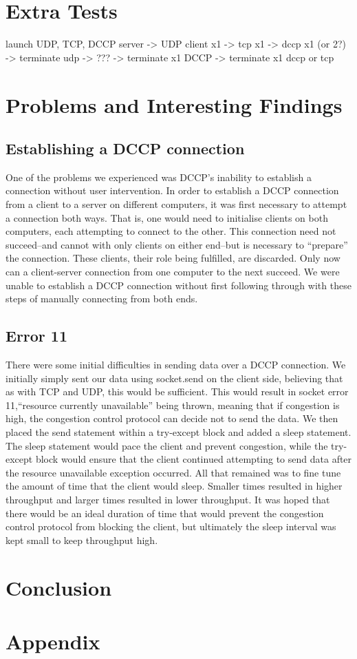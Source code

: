 \documentclass[10pt,a4paper]{article}
\begin{document}
\section{Extra Tests} %

launch UDP, TCP, DCCP server -> UDP client x1 -> tcp x1 -> dccp x1 (or 2?) ->
terminate udp -> ??? -> terminate x1 DCCP -> terminate x1 dccp or tcp

\section{Problems and Interesting Findings}

\subsection{Establishing a DCCP connection}
One of the problems we experienced was DCCP's inability to establish a connection
without user intervention. In order to establish a DCCP connection from a client to
a server on different computers, it was first necessary to attempt a connection both ways. 
That is, one would need to initialise clients on both computers, each attempting to connect
to the other. This connection need not succeed--and cannot with only clients on either end--but 
is necessary to ``prepare'' the connection. These clients, their role being fulfilled, are
discarded. Only now can a client-server connection from one computer to the next succeed. 
We were unable to establish a DCCP connection without first following through with these steps of 
manually connecting from both ends.

\subsection{Error 11}
There were some initial difficulties in sending data over a DCCP connection. We initially
simply sent our data using socket.send on the client side, believing that as with TCP
and UDP, this would be sufficient. This would result in socket error 11,``resource currently
unavailable'' being thrown, meaning that if congestion is high, the congestion control 
protocol can decide not to send the data. We then placed the send statement within a try-except
block and added a sleep statement. The sleep statement would pace the client and prevent
congestion, while the try-except block would ensure that the client
continued attempting to send data after the resource unavailable exception occurred. All that
remained was to fine tune the amount of time that the client would sleep. Smaller times resulted
in higher throughput and larger times resulted in lower throughput. It was hoped that there would be
an ideal duration of time that would prevent the congestion control protocol from blocking the client,
but ultimately the sleep interval was kept small to keep throughput high.

\section{Conclusion}



\newpage
\appendix
\section{Appendix}
\label{appa}
\end{document}
